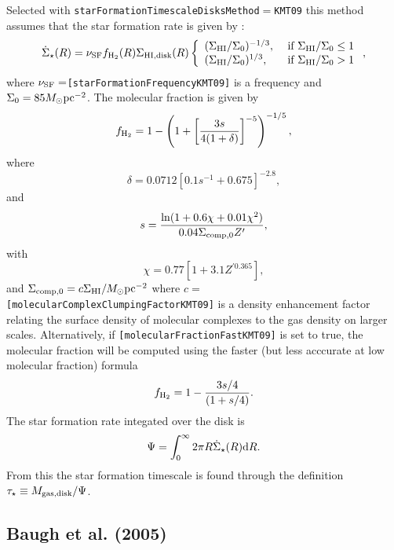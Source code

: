 Selected with {\tt starFormationTimescaleDisksMethod}$=${\tt KMT09} this method assumes that the star formation rate is given by \citep{krumholz_star_2009}:
\begin{equation}
 \dot{\Sigma}_\star(R) = \nu_{\rm SF} f_{\rm H_2}(R)\Sigma_{\rm HI, disk}(R) \left\{ \begin{array}{ll} (\Sigma_{\rm HI}/\Sigma_0)^{-1/3}, &  \hbox{ if } \Sigma_{\rm HI}/\Sigma_0 \le 1 \\ (\Sigma_{\rm HI}/\Sigma_0)^{1/3}, & \hbox{ if } \Sigma_{\rm HI}/\Sigma_0 > 1 \end{array} \right. ,
\end{equation}
where $\nu_{\rm SF}=${\tt [starFormationFrequencyKMT09]} is a frequency and $\Sigma_0=85 M_\odot \hbox{pc}^{-2}$. The molecular fraction is given by
\begin{equation}
 f_{\rm H_2} = 1 - \left( 1 + \left[ { 3 s \over 4 (1+\delta)} \right]^{-5} \right)^{-1/5},
\end{equation}
where
\begin{equation}
 \delta = 0.0712 \left[ 0.1 s^{-1} + 0.675 \right]^{-2.8},
\end{equation}
and
\begin{equation}
 s = {\ln(1+0.6\chi+0.01\chi^2) \over 0.04 \Sigma_{\rm comp,0} Z^\prime},
\end{equation}
with
\begin{equation}
 \chi = 0.77 \left[ 1 + 3.1 Z^{\prime 0.365} \right],
\end{equation}
and $\Sigma_{\rm comp,0}=c \Sigma_{\rm HI}/M_\odot \hbox{pc}^{-2}$ where $c=${\tt [molecularComplexClumpingFactorKMT09]} is a density enhancement factor relating the surface density of molecular complexes to the gas density on larger scales. Alternatively, if {\tt [molecularFractionFastKMT09]} is set to true, the molecular fraction will be computed using the faster (but less acccurate at low molecular fraction) formula
\begin{equation}
 f_{\rm H_2} = 1 - { 3s/4 \over (1 + s/4)}.
\end{equation}
The star formation rate integated over the disk is
\begin{equation}
 \Psi = \int_0^\infty 2 \pi R \dot{\Sigma}_\star(R) \d R.
\end{equation}
From this the star formation timescale is found through the definition $\tau_\star \equiv M_{\rm gas, disk}/\Psi$.

\subsection{Baugh et al. (2005)}

